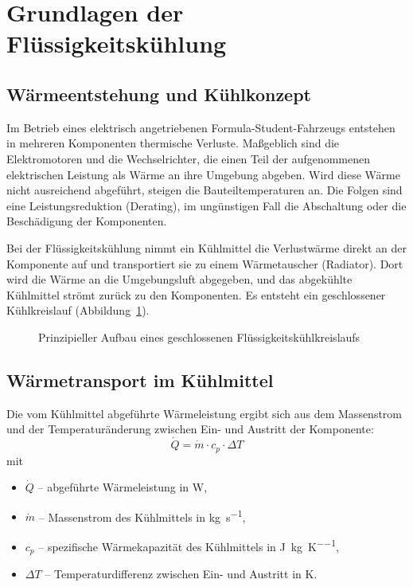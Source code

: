\section{Grundlagen der Flüssigkeitskühlung}
\label{sec:grundlagen_kuehlung}

\subsection{Wärmeentstehung und Kühlkonzept}
\label{subsec:waermeentstehung}

Im Betrieb eines elektrisch angetriebenen Formula-Student-Fahrzeugs entstehen in
mehreren Komponenten thermische Verluste. Maßgeblich sind die Elektromotoren und
die Wechselrichter, die einen Teil der aufgenommenen elektrischen Leistung als
Wärme an ihre Umgebung abgeben. Wird diese Wärme nicht ausreichend abgeführt,
steigen die Bauteiltemperaturen an. Die Folgen sind eine Leistungsreduktion
(Derating), im ungünstigen Fall die Abschaltung oder die Beschädigung der
Komponenten.

Bei der Flüssigkeitskühlung nimmt ein Kühlmittel die Verlustwärme direkt an der
Komponente auf und transportiert sie zu einem Wärmetauscher (Radiator). Dort
wird die Wärme an die Umgebungsluft abgegeben, und das abgekühlte Kühlmittel
strömt zurück zu den Komponenten. Es entsteht ein geschlossener Kühlkreislauf
(Abbildung~\ref{fig:kuehlkreislauf_prinzip}).

\begin{figure}[htb]
  \centering
  \caption{Prinzipieller Aufbau eines geschlossenen Flüssigkeitskühlkreislaufs}
  \label{fig:kuehlkreislauf_prinzip}
\end{figure}

\subsection{Wärmetransport im Kühlmittel}
\label{subsec:waermetransport}

Die vom Kühlmittel abgeführte Wärmeleistung ergibt sich aus dem Massenstrom
und der Temperaturänderung zwischen Ein- und Austritt der Komponente:
\begin{equation}
  \dot{Q} = \dot{m} \cdot c_p \cdot \Delta T
  \label{eq:waermeleistung}
\end{equation}
mit
\begin{itemize}
  \item $\dot{Q}$ -- abgeführte Wärmeleistung in \si{\watt},
  \item $\dot{m}$ -- Massenstrom des Kühlmittels in \si{\kilo\gram\per\second},
  \item $c_p$ -- spezifische Wärmekapazität des Kühlmittels in
        \si{\joule\per\kilo\gram\per\kelvin},
  \item $\Delta T$ -- Temperaturdifferenz zwischen Ein- und Austritt in \si{\kelvin}.
\end{itemize}

